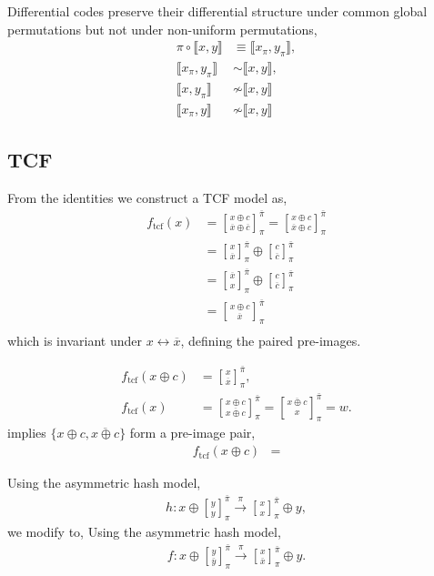 \documentclass[twocolumn, aps, amsmath, amssymb, nofootinbib, superscriptaddress, longbibliography, doublefloatfix, table-of-contents, eqsecnum, rmp]{revtex4-2}
\def\diff#1#2{\llbracket #1,#2\rrbracket}
\newcommand{\stackbraid}[2]{{\genfrac{[}{]}{0pt}{}{{#1}}{{#2}}}^{\bar{\pi}}_{\pi}}
\begin{document}
Differential codes preserve their differential structure under common global permutations but not under non-uniform permutations,
\begin{align}
	\pi\circ \diff{x}{y}	 &\equiv \diff{x_\pi}{y_\pi},\nonumber\\
 	\diff{x_\pi}{y_\pi} &\sim \diff{x}{y},\nonumber\\
	\diff{x}{y_\pi} &\not\sim \diff{x}{y} \nonumber\\
	\diff{x_\pi}{y} &\not\sim \diff{x}{y}
\end{align}

\subsection{TCF}

From the identities we construct a TCF model as,
\begin{align}
	f_\mathrm{tcf}(x) &= \stackbraid{x\oplus c}{\overline{x}\oplus \overline{c}} = \stackbraid{x\oplus c}{\overline{x}\oplus c}\nonumber\\
	&= \stackbraid{x}{\overline{x}} \oplus \stackbraid{c}{\overline{c}}\nonumber\\
	&= \stackbraid{\overline{x}}{x} \oplus \stackbraid{c}{\overline{c}}\nonumber\\
	&= \stackbraid{x\oplus c}{\overline{x}} \nonumber\\
\end{align}
which is invariant under $x\leftrightarrow \overline{x}$, defining the paired pre-images.

\begin{align}
	f_\mathrm{tcf}(x\oplus c) &= \stackbraid{x}{\overline{x}}, \nonumber\\
	f_\mathrm{tcf}(x) &= \stackbraid{x\oplus c}{\overline{x\oplus c}} = \stackbraid{\overline{x\oplus c}}{x} = w.
\end{align}
implies $\{x\oplus c, \overline{x\oplus c}\}$ form a pre-image pair,
\begin{align}
	f_\mathrm{tcf}(x\oplus c) &= 
\end{align}

Using the asymmetric hash model,
\begin{align}
	h: x\oplus \stackbraid{y}{y} \xrightarrow{\pi} \stackbraid{x}{x} \oplus y,
\end{align}
we modify to,
Using the asymmetric hash model,
\begin{align}
	f: x\oplus \stackbraid{y}{\bar{y}} \xrightarrow{\pi} \stackbraid{x}{\bar{x}} \oplus y.
\end{align}
\end{document}
